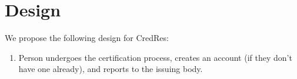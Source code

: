 \section{Design}

We propose the following design for CredRes:
\begin{enumerate}
    \item Person undergoes the certification process, creates an account (if they don’t have one already), and reports to the issuing body.
\end{enumerate}

